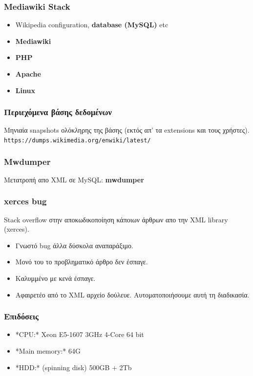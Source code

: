 \documentclass[bigger]{beamer}
\begin{document}
\begin{frame}
  \frametitle{Mediawiki Stack}

  \begin{itemize}
  \item Wikipedia configuration, \textbf<2>{database (MySQL)} etc
  \item \textbf<2>{Mediawiki}
  \item \textbf<2>{PHP}
  \item \textbf<2>{Apache}
  \item \textbf<2>{Linux}
  \end{itemize}
  \vfill
  \vfill
\end{frame}

\begin{frame}
  \frametitle{Περιεχόμενα βάσης δεδομένων}

  Μηνιαία snapshots ολόκληρης της βάσης (εκτός απ' τα extensions και
  τους χρήστες).
  \vfill
  \texttt{https://dumps.wikimedia.org/enwiki/latest/} \vfill
\end{frame}

\begin{frame}
  \frametitle{Mwdumper}

  Μετατροπή απο XML σε MySQL: \bf{mwdumper}
\end{frame}

\begin{frame}
  \frametitle{xerces bug} Stack overflow στην αποκωδικοποίηση κάποιων
  άρθρων απο την XML library (xerces).
  \vfill
  \begin{itemize}
  \item<2-> Γνωστό bug άλλα δύσκολα αναπαράξιμο.
  \item<3-> Μονό του το προβληματικό άρθρο δεν έσπαγε.
  \item<4-> Καλυμμένο με κενά έσπαγε.
  \item<5-> Αφαιρετέο από το XML αρχείο δούλευε.
    Αυτοματοποιήσουμε αυτή τη διαδικασία.
  \end{itemize}
\end{frame}


\begin{frame}
  \frametitle{Επιδόσεις}
  \begin{itemize}
  \item *CPU:* Xeon E5-1607 3GHz 4-Core 64 bit
  \item *Main memory:* 64G
  \item  *HDD:* (spinning disk) 500GB + 2Tb
  \end{itemize}
\end{frame}
\end{document}
